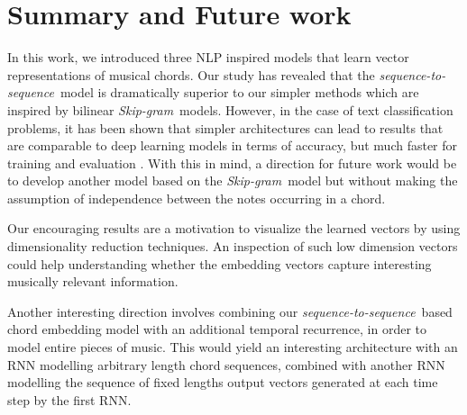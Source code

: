 \documentclass{article}
\newcommand{\skipgram}{\textit{Skip-gram}}
\newcommand{\seqtoseq}{\textit{sequence-to-sequence}}
\begin{document}
\section{Summary and Future work}
\label{sec:summary}
In this work, we introduced three NLP inspired models that learn vector representations of musical chords.
Our study has revealed that the \seqtoseq\ model is dramatically superior to our simpler methods which are inspired by bilinear \skipgram\ models. However, in the case of text classification problems, it has been shown that simpler architectures can lead to results that are comparable to deep learning models in terms of accuracy, but much faster for training and evaluation \citep{JoulinGBM16}.
With this in mind, a direction for future work would be to develop another model based on the \skipgram\ model but without making the assumption of independence between the notes occurring in a chord. 

Our encouraging results are a motivation to visualize the learned vectors by using dimensionality reduction techniques. An inspection of such low dimension vectors could help understanding whether the embedding vectors capture interesting musically relevant information.

Another interesting direction involves combining our \seqtoseq\ based chord embedding model with an additional temporal recurrence, in order to model entire pieces of music. This would yield an interesting architecture with an RNN modelling arbitrary length chord sequences, combined with another RNN modelling the sequence of fixed lengths output vectors generated at each time step by the first RNN.


 
\end{document}
